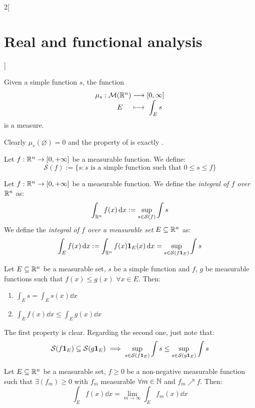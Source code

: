 \documentclass[../../../main_math.tex]{subfiles}
\begin{document}
\begin{multicols}{2}[\section{Real and functional analysis}]
\begin{proposition}
    Given a simple function $s$, the function $$\function{\mu_s}{\mathcal{M}(\RR^n)}{[0,\infty]}{E}{\displaystyle\int_E s}$$ is a measure.
  \end{proposition}
  \begin{sproof}
    Clearly $\mu_s(\varnothing)=0$ and the property of  is exactly .
  \end{sproof}
  \begin{definition}
    Let $f:\mathbb{R}^n\rightarrow[0,+\infty]$ be a measurable function. We define: $$\mathcal{S}(f):=\{s:s\text{ is a simple function such that }0\leq s\leq f\}$$
  \end{definition}
  \begin{definition}
    Let $f:\mathbb{R}^n\rightarrow[0,+\infty]$ be a measurable function. We define the \emph{integral of $f$ over $\mathbb{R}^n$} as: $$\int_{\mathbb{R}^n}f(x)\dd{x}:=\sup_{s\in\mathcal{S}(f)}\int s$$ We define the \emph{integral of $f$ over a measurable set $E\subseteq \mathbb{R}^n$} as: $$\int_{E}f(x)\dd{x}:=\int_{\mathbb{R}^n}f(x)\boldsymbol{\mathrm{1}}_{E}(x)\dd{x}=\sup_{s\in\mathcal{S}(f\boldsymbol{\mathrm{1}}_{E})}\int s$$
  \end{definition}
  \begin{proposition}
    Let $E\subseteq\mathbb{R}^n$ be a measurable set, $s$ be a simple function and $f$, $g$ be measurable functions such that $f(x)\leq g(x)$ $\forall x\in E$. Then:
    \begin{enumerate}
      \item $\displaystyle\int_E s=\int_Es(x)\dd{x}$
      \item $\displaystyle\int_E f(x)\dd{x}\leq \int_Eg(x)\dd{x}$
    \end{enumerate}
  \end{proposition}
  \begin{sproof}
    The first property is clear. Regarding the second one, just note that: $$\mathcal{S}(f\boldsymbol{\mathrm{1}}_{E})\subseteq \mathcal{S}(g\boldsymbol{\mathrm{1}}_{E})\implies \sup_{s\in\mathcal{S}(f\boldsymbol{\mathrm{1}}_{E})}\int s\leq \sup_{s\in\mathcal{S}(g\boldsymbol{\mathrm{1}}_{E})}\int s$$
  \end{sproof}
  \begin{important}
    \begin{theorem}\label{RFA:monotone}
      Let $E\subseteq\mathbb{R}^n$ be a measurable set, $f\geq 0$ be a non-negative measurable function such that $\exists (f_m)\geq 0$ with $f_m$ measurable $\forall m\in\mathbb{N}$ and $f_m\nearrow f$. Then: $$\int_Ef(x)\dd{x}=\lim_{m\to\infty}\int_Ef_m(x)\dd{x}$$
    \end{theorem}

\end{important}
\end{multicols}
\end{document}
